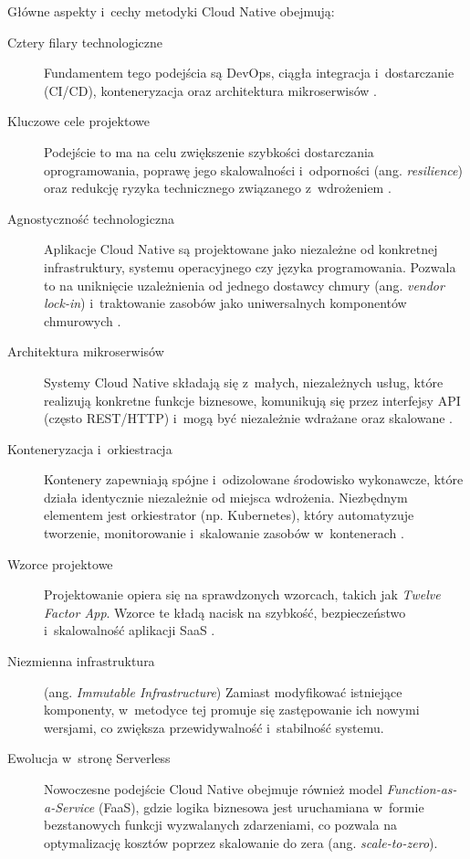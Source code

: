 Główne aspekty i~cechy metodyki Cloud Native obejmują:

\begin{description}
    \item[Cztery filary technologiczne] Fundamentem tego podejścia są DevOps, ciągła integracja i~dostarczanie (CI/CD), konteneryzacja oraz architektura mikroserwisów \cite{Kratzke2017CloudNative}.
    \item[Kluczowe cele projektowe] Podejście to ma na celu zwiększenie szybkości dostarczania oprogramowania, poprawę jego skalowalności i~odporności (ang. \textit{resilience}) oraz redukcję ryzyka technicznego związanego z~wdrożeniem \cite{Oyekunle2024CloudNativeReview}.
    \item[Agnostyczność technologiczna] Aplikacje Cloud Native są projektowane jako niezależne od konkretnej infrastruktury, systemu operacyjnego czy języka programowania. Pozwala to na uniknięcie uzależnienia od jednego dostawcy chmury (ang. \textit{vendor lock-in}) i~traktowanie zasobów jako uniwersalnych komponentów chmurowych \cite{Alonso2023MultiCloudNative}.
    \item[Architektura mikroserwisów] Systemy Cloud Native składają się z~małych, niezależnych usług, które realizują konkretne funkcje biznesowe, komunikują się przez interfejsy API (często REST/HTTP) i~mogą być niezależnie wdrażane oraz skalowane \cite{Balalaie2016MicroservicesDevOps}.
    \item[Konteneryzacja i~orkiestracja] Kontenery zapewniają spójne i~odizolowane środowisko wykonawcze, które działa identycznie niezależnie od miejsca wdrożenia. Niezbędnym elementem jest orkiestrator (np. Kubernetes), który automatyzuje tworzenie, monitorowanie i~skalowanie zasobów w~kontenerach \cite{Mondal2023KubernetesAutoscaling}.
    \item[Wzorce projektowe] Projektowanie opiera się na sprawdzonych wzorcach, takich jak \textit{Twelve Factor App}. Wzorce te kładą nacisk na szybkość, bezpieczeństwo i~skalowalność aplikacji SaaS \cite{Wiggins2012TwelveFactor}.
    \item[Niezmienna infrastruktura] (ang. \textit{Immutable Infrastructure}) Zamiast modyfikować istniejące komponenty, w~metodyce tej promuje się zastępowanie ich nowymi wersjami, co zwiększa przewidywalność i~stabilność systemu.
    \item[Ewolucja w~stronę Serverless] Nowoczesne podejście Cloud Native obejmuje również model \textit{Function-as-a-Service} (FaaS), gdzie logika biznesowa jest uruchamiana w~formie bezstanowych funkcji wyzwalanych zdarzeniami, co pozwala na optymalizację kosztów poprzez skalowanie do zera (ang. \textit{scale-to-zero}).
\end{description}

